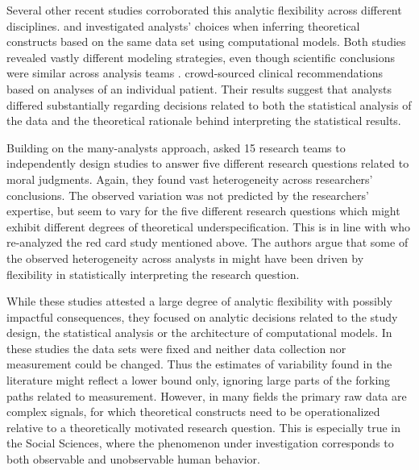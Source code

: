 \documentclass[Review,times,sageh]{sagej}
\begin{document}
Several other recent studies corroborated this analytic flexibility across different disciplines.
\citet{dutilh2019} and \citet{starns2019assessing} investigated analysts' choices when inferring theoretical constructs based on the same data set using computational models.
Both studies revealed vastly different modeling strategies, even though scientific conclusions were similar across analysis teams \citep[see also][and \citet{botvinik-nezer2020}, regarding analytic flexibility in ecology and neuroimaging data, respectively]{Parker2020}.
\citet{bastiaansen2020} crowd-sourced clinical recommendations based on analyses of an individual patient.
Their results suggest that analysts differed substantially regarding decisions related to both the statistical analysis of the data and the theoretical rationale behind interpreting the statistical results.

Building on the many-analysts approach, \citet{landy2020crowdsourcing} asked 15 research teams to independently design studies to answer five different research questions related to moral judgments.
Again, they found vast heterogeneity across researchers' conclusions.
The observed variation was not predicted by the researchers' expertise, but seem to vary for the five different research questions which might exhibit different degrees of theoretical underspecification.
This is in line with \citet{auspurg2021has} who re-analyzed the red card study mentioned above.
The authors argue that some of the observed heterogeneity across analysts in \citet{silberzahn2018many} might have been driven by flexibility in statistically interpreting the research question.

While these studies attested a large degree of analytic flexibility with possibly impactful consequences, they focused on analytic decisions related to the study design, the statistical analysis or the architecture of computational models.
In these studies the data sets were fixed and neither data collection nor measurement could be changed.
Thus the estimates of variability found in the literature might reflect a lower bound only, ignoring large parts of the forking paths related to measurement.
However, in many fields the primary raw data are complex signals, for which theoretical constructs need to be operationalized relative to a theoretically motivated research question.
This is especially true in the Social Sciences, where the phenomenon under investigation corresponds to both observable and unobservable human behavior.
\end{document}
